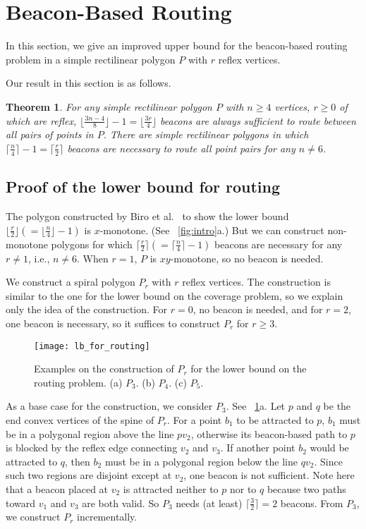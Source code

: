 \documentclass[11pt]{article}
\newtheorem{theorem}{Theorem}
\theoremstyle{definition}
\let\geq\geqslant
\begin{document}
\section{Beacon-Based Routing} \label{sec:routing}


In this section, we give an improved upper bound for the beacon-based routing problem in a simple rectilinear polygon $P$ with $r$ reflex vertices. 

Our result in this section is as follows.
\begin{theorem}
\label{thm:routing}
 For any simple rectilinear polygon $P$ with $n\geq 4$ vertices, $r\geq 0$ of which are reflex,
 $\lfloor \frac{3n-4}{8}\rfloor-1=\lfloor \frac{3r}{4}\rfloor$ beacons are always sufficient
 to route between all pairs of points in $P$. There are simple rectilinear polygons in which $\lceil \frac{n}{4}\rceil-1=\lceil \frac{r}{2}\rceil$ beacons are necessary to route all point pairs for any $n\neq 6$.
\end{theorem}



\subsection{Proof of the lower bound for routing}
The polygon constructed by Biro et al.~\cite{bgikm-cccg-13} to show the lower bound $\lfloor \frac{r}{2}\rfloor(=\lfloor \frac{n}{4}\rfloor -1)$ is $x$-monotone. (See \figurename~\ref{fig:intro}a.) But we can construct non-monotone polygons for which $\lceil \frac{r}{2}\rceil (=\lceil \frac{n}{4}\rceil -1)$ beacons are necessary for any $r\neq 1$, i.e., $n\neq 6$. When $r=1$, $P$ is $xy$-monotone, so no beacon is needed.

We construct a spiral polygon $P_r$ with $r$ reflex vertices. The construction is similar to the one for the lower bound on the coverage problem, so we explain only the idea of the construction. For $r=0$, no beacon is needed, and for $r=2$, one beacon is necessary, so it suffices to construct $P_r$ for $r \geq 3$. 

\begin{figure}[tb]
\centering
\texttt{[image: lb\_for\_routing]}
\caption{Examples on the construction of $P_r$ for the lower bound on the routing problem. (a) $P_3$. (b) $P_4$. (c) $P_5$.}
\label{fig:lb_for_routing}
\end{figure}

As a base case for the construction, we consider $P_3$. See \figurename~\ref{fig:lb_for_routing}a. Let $p$ and $q$ be the end convex vertices of the spine of $P_r$. For a point $b_1$ to be attracted to $p$, $b_1$ must be in a polygonal region above the line $pv_2$, otherwise its beacon-based path to $p$ is blocked by the reflex edge connecting $v_2$ and $v_3$. If another point $b_2$ would be attracted to $q$, then $b_2$ must be in a polygonal region below the line $qv_2$. Since such two regions are disjoint except at $v_2$, one beacon is not sufficient. Note here that a beacon placed at $v_2$ is attracted neither to $p$ nor to $q$ because two paths toward $v_1$ and $v_3$ are both valid. So $P_3$ needs (at least) $\lceil \frac{3}{2}\rceil =2$ beacons. From $P_3$, we construct $P_r$ incrementally. 
\end{document}
